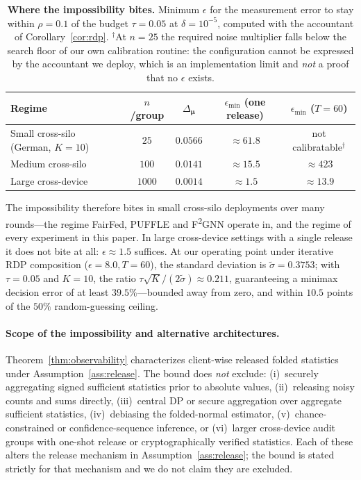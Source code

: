 \documentclass[preprint,12pt]{elsarticle}
\theoremstyle{plain}
\theoremstyle{definition}
\theoremstyle{remark}
\begin{document}
\begin{table}[h]
\centering
\small
\caption{\textbf{Where the impossibility bites.} Minimum $\epsilon$ for the measurement error to stay within $\rho = 0.1$ of the budget $\tau = 0.05$ at $\delta = 10^{-5}$, computed with the accountant of Corollary~\ref{cor:rdp}. $^\dagger$At $n = 25$ the required noise multiplier falls below the search floor of our own calibration routine: the configuration cannot be expressed by the accountant we deploy, which is an implementation limit and \emph{not} a proof that no $\epsilon$ exists.}
\label{tab:regimes}
\begin{tabular}{lcccc}
\toprule
\textbf{Regime} & \textbf{$n$/group} & \textbf{$\Delta_{\bm{\mu}}$} & \textbf{$\epsilon_{\min}$ (one release)} & \textbf{$\epsilon_{\min}$ ($T=60$)} \\
\midrule
Small cross-silo (German, $K=10$) & $25$ & $0.0566$ & $\approx 61.8$ & not calibratable$^\dagger$ \\
Medium cross-silo & $100$ & $0.0141$ & $\approx 15.5$ & $\approx 423$ \\
Large cross-device & $1000$ & $0.0014$ & $\approx 1.5$ & $\approx 13.9$ \\
\bottomrule
\end{tabular}
\end{table}

\noindent The impossibility therefore bites in small cross-silo deployments over many rounds---the regime FairFed, PUFFLE and F\textsuperscript{2}GNN operate in, and the regime of every experiment in this paper. In large cross-device settings with a single release it does not bite at all: $\epsilon \approx 1.5$ suffices. At our operating point under iterative RDP composition ($\epsilon = 8.0, T=60$), the standard deviation is $\tilde\sigma = 0.3753$; with $\tau=0.05$ and $K=10$, the ratio $\tau\sqrt{K}/(2\tilde\sigma) \approx 0.211$, guaranteeing a minimax decision error of at least $39.5\%$---bounded away from zero, and within $10.5$ points of the $50\%$ random-guessing ceiling.

\paragraph{Scope of the impossibility and alternative architectures.}
Theorem~\ref{thm:observability} characterizes client-wise released folded statistics under Assumption~\ref{ass:release}. The bound does \emph{not} exclude: (i)~securely aggregating signed sufficient statistics prior to absolute values, (ii)~releasing noisy counts and sums directly, (iii)~central DP or secure aggregation over aggregate sufficient statistics, (iv)~debiasing the folded-normal estimator, (v)~chance-constrained or confidence-sequence inference, or (vi)~larger cross-device audit groups with one-shot release or cryptographically verified statistics. Each of these alters the release mechanism in Assumption~\ref{ass:release}; the bound is stated strictly for that mechanism and we do not claim they are excluded.
\end{document}
